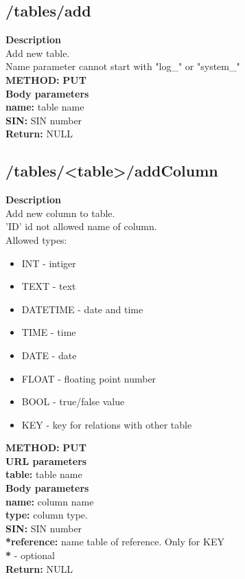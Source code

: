 \documentclass[a4paper, 12pt]{report}
\begin{document}
\subsection{/tables/add}
\textbf{\color{redText} Description} \\
Add new table. \\
Name parameter cannot start with "log\_" or "system\_" \\
\textbf{\color{redText} METHOD: } \textbf{PUT} \\
\textbf{\color{redText} Body parameters} \\
\textbf{name: } table name\\
\textbf{SIN: } SIN number\\
\textbf{\color{redText} Return: } NULL

\subsection{/tables/<table>/addColumn}
\textbf{\color{redText} Description} \\
Add new column to table. \\
'ID' id not allowed name of column.\\
Allowed types: 
\begin{itemize}
    \item INT - intiger 
    \item TEXT - text 
    \item DATETIME - date and time 
    \item TIME - time
    \item DATE - date
    \item FLOAT - floating point number
    \item BOOL - true/false value
    \item KEY - key for relations with other table
\end{itemize}
\textbf{\color{redText} METHOD: } \textbf{PUT} \\
\textbf{\color{redText} URL parameters} \\
\textbf{table: } table name\\
\textbf{\color{redText} Body parameters} \\
\textbf{name: } column name\\
\textbf{type: } column type.\\
\textbf{SIN: } SIN number\\
\textbf{*reference: } name table of reference. Only for KEY \\
\textbf{*} - optional \\
\textbf{\color{redText} Return: } NULL
\end{document}
